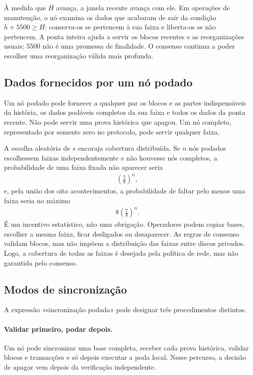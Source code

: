 À medida que \(H\) avança, a janela recente avança com ele. Em operações de
manutenção, o nó examina os dados que acabaram de sair da condição
\(h+5500\geq H\): conserva-os se pertencem à sua faixa e liberta-os se não
pertencem. A ponta inteira ajuda a servir os blocos recentes e as
reorganizações usuais; 5500 não é uma promessa de finalidade. O consenso
continua a poder escolher uma reorganização válida mais profunda.


\subsection{Dados fornecidos por um nó podado}
\label{subsec:pruning-serving}

Um nó podado pode fornecer a qualquer par os blocos e as partes indispensáveis
da história, os dados podáveis completos da sua faixa e todos os dados da
ponta recente. Não pode servir uma prova histórica que apagou. Um nó completo,
representado por semente zero no protocolo, pode servir qualquer faixa.

A escolha aleatória de \(s\) encoraja cobertura distribuída. Se \(n\) nós
podados escolhessem faixas independentemente e não houvesse nós completos, a
probabilidade de uma faixa fixada não aparecer seria
\begin{align}
 \left(\frac78\right)^n,
 \label{eq:pruning-missing-one-stripe}
\end{align}
e, pela união dos oito acontecimentos, a probabilidade de faltar pelo menos
uma faixa seria no máximo
\begin{align}
 8\left(\frac78\right)^n.
 \label{eq:pruning-missing-any-stripe}
\end{align}
É um incentivo estatístico, não uma obrigação. Operadores podem copiar bases,
escolher a mesma faixa, ficar desligados ou desaparecer. As regras de consenso
validam blocos, mas não impõem a distribuição das faixas entre discos
privados. Logo, a cobertura de todas as faixas é desejada pela política de
rede, mas não garantida pelo consenso.


\subsection{Modos de sincronização}
\label{subsec:pruned-sync-modes}

A expressão «sincronização podada» pode designar três procedimentos distintos.

\paragraph{Validar primeiro, podar depois.}
Um nó pode sincronizar uma base completa, receber cada prova histórica,
validar blocos e transacções e só depois executar a poda local. Nesse percurso,
a decisão de apagar vem depois da verificação independente.

